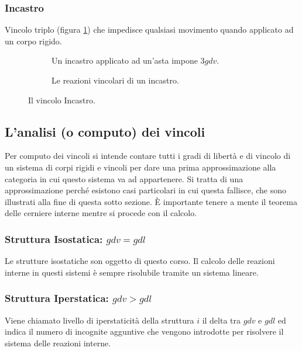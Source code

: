 \documentclass[main.tex]{subfiles}
\begin{document}
\subsubsection{Incastro}
Vincolo triplo (figura \ref{incastro}) che impedisce qualsiasi movimento quando applicato ad un corpo rigido.

\begin{figure}[H]
  \begin{subfigure}[b]{.5\textwidth}
  	\centering
  	\resizebox{0.5\textwidth}{!}{}
  	\caption{Un incastro applicato ad un’asta impone $3 gdv$.}
  \end{subfigure}
  \hfill
  \begin{subfigure}[b]{.5\textwidth}
  \centering
  	\resizebox{0.5\textwidth}{!}{}
  	\caption{Le reazioni vincolari di un incastro.}
  \end{subfigure}
  \caption{Il vincolo Incastro.}
  \label{incastro}
\end{figure}

\subsection{L'analisi (o computo) dei vincoli}
Per computo dei vincoli si intende contare tutti i gradi di libertà e di vincolo di un sistema di corpi rigidi e vincoli per dare una prima approssimazione alla categoria in cui questo sistema va ad appartenere. Si tratta di una approssimazione perché esistono casi particolari in cui questa fallisce, che sono illustrati alla fine di questa sotto sezione. È importante tenere a mente il teorema delle cerniere interne mentre si procede con il calcolo.

\subsubsection{Struttura Isostatica: $gdv = gdl$}
Le strutture isostatiche son oggetto di questo corso. Il calcolo delle reazioni interne in questi sistemi è sempre risolubile tramite un sistema lineare.

\subsubsection{Struttura Iperstatica: $gdv > gdl$}
Viene chiamato livello di iperstaticità della struttura $i$ il delta tra $gdv$ e $gdl$ ed indica il numero di incognite agguntive che vengono introdotte per risolvere il sistema delle reazioni interne.
\end{document}

